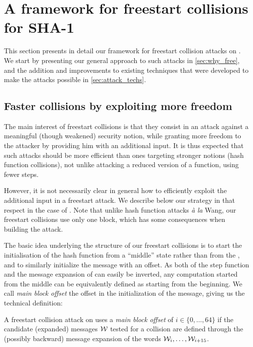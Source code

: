 \section{A framework for freestart collisions for SHA-1}
\label{sec:framework}
This section presents in detail our framework for freestart collision attacks on \shaone. We start by presenting our general approach to such attacks
in \autoref{sec:why_free}, and the addition and improvements to existing techniques that were developed to make the attacks possible in \autoref{sec:attack_techs}.

\subsection{Faster collisions by exploiting more freedom}
\label{sec:why_free}

The main interest of freestart collisions is that they consist in an attack against a meaningful (though weakened) security notion, while granting more freedom to
the attacker by providing him with an additional input. It is thus expected that such attacks should be more efficient than ones targeting stronger notions (\eg hash function
collisions), not unlike attacking a reduced version of a function, using fewer steps.

However, it is not necessarily clear in general how to efficiently exploit the additional input in a freestart attack. We describe below our strategy in that respect
in the case of \shaone. Note that unlike hash function attacks \emph{à la} Wang, our freestart collisions use only one block, which has some consequences when
building
the attack.

\medskip

The basic idea underlying the structure of our freestart collisions is to start the initialisation of the hash function from a ``middle'' state rather than from the \iv,
and to similarly initialize the message with an offset. As both of the step function and the message expansion of \shaone can easily be inverted, any computation started
from the middle can be equivalently defined as starting from the beginning. We call \emph{main block offset} the offset in the initialization of the message, giving us
the technical definition:

\begin{defi}
A freestart collision attack on \shaone uses a \emph{main block offset} of $i \in \{0, \ldots, 64\}$ if the candidate (expanded) messages $\mathcal{W}$ tested for a collision are defined
through the (possibly backward) message expansion of the words $\mathcal{W}_i, \ldots, \mathcal{W}_{i + 15}$.
\end{defi}

